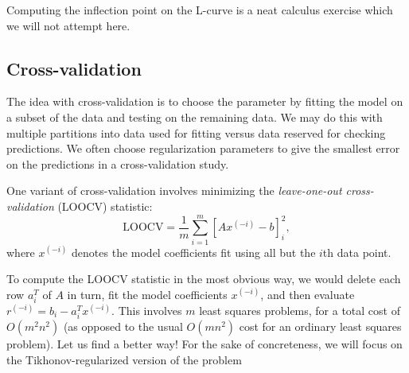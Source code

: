 \documentclass[12pt, leqno]{article} %
\begin{document}
Computing the inflection point on the L-curve is a neat calculus
exercise which we will not attempt here.

\subsection{Cross-validation}

The idea with cross-validation is to choose the parameter
by fitting the model on a subset of the data and testing on the remaining
data.  We may do this with multiple partitions into data used for fitting
versus data reserved for checking predictions.
We often choose regularization parameters to give the smallest error on
the predictions in a cross-validation study.

One variant of cross-validation involves minimizing the
{\em leave-one-out cross-validation} (LOOCV) statistic:
\[
  \mbox{LOOCV} = \frac{1}{m} \sum_{i=1}^m \left[ Ax^{(-i)}-b \right]_i^2,
\]
where $x^{(-i)}$ denotes the model coefficients fit using all but the
$i$th data point.

To compute the LOOCV statistic in the most obvious way, we would
delete each row $a_i^T$ of $A$ in turn, fit the model coefficients
$x^{(-i)}$, and then evaluate $r^{(-i)} = b_i - a_i^T x^{(-i)}$.
This involves $m$
least squares problems, for a total cost of $O(m^2 n^2)$ (as opposed
to the usual $O(mn^2)$ cost for an ordinary least squares problem).
Let us find a better way!  For the sake of concreteness, we will focus
on the Tikhonov-regularized version of the problem
\end{document}
